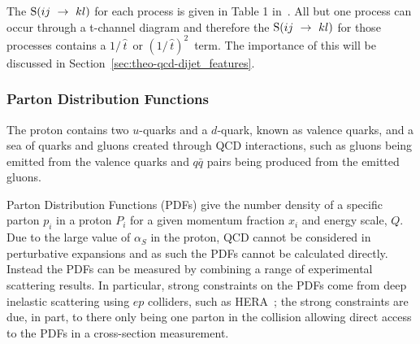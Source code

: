 The $\text{S}\nobreak(ij~\to~kl)$ for each process is given in Table 1 in~\cite{theo-dijet_harris}.
All but one process can occur through a t-channel diagram and therefore the 
$\text{S}\nobreak(ij~\to~kl)$ for those processes contains a $1/\,\hat{t}\,$ or $(1/\,\hat{t})^2\,$ term.
The importance of this will be discussed in Section~\ref{sec:theo-qcd-dijet_features}.


\subsubsection{Parton Distribution Functions}
\label{sec:theo-qcd_pdf}

The proton contains two $u$-quarks and a $d$-quark, known as valence quarks, and a sea of quarks and gluons created
through QCD interactions, such as gluons being emitted from the valence quarks and $q\bar{q}$ pairs being produced from the emitted gluons.

Parton Distribution Functions (PDFs) give the number density of a specific parton $p_i$ in a proton $P_i$
for a given momentum fraction $x_i$ and energy scale, $Q$.
Due to the large value of $\alpha_S$ in the proton, QCD cannot be considered in perturbative expansions and as such the PDFs cannot be calculated directly.
Instead the PDFs can be measured by combining a range of experimental scattering results.
In particular, strong constraints on the PDFs come from deep inelastic scattering using $ep$ colliders, such as HERA~\cite{theo-qcd_hera};
the strong constraints are due, in part, to there only being one parton in the collision allowing direct access to the PDFs in a cross-section measurement.

